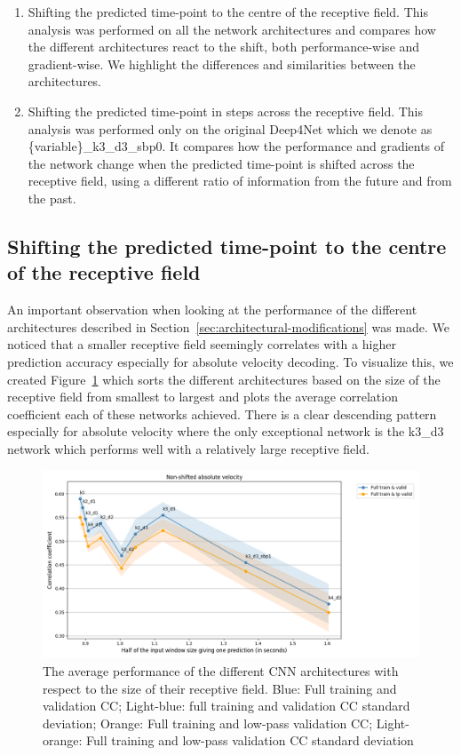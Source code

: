 \begin{enumerate}
    \item Shifting the predicted time-point to the centre of the receptive field.
This analysis was performed on all the network architectures and compares how the different architectures react to the shift, both performance-wise and gradient-wise.
We highlight the differences and similarities between the architectures.
    \item Shifting the predicted time-point in steps across the receptive field.
This analysis was performed only on the original Deep4Net which we denote as \{variable\}\_k3\_d3\_sbp0.
It compares how the performance and gradients of the network change when the predicted time-point is shifted across the receptive field, using a different ratio of information from the future and from the past.
\end{enumerate}


\subsection{Shifting the predicted time-point to the centre of the receptive field}\label{subsec:shifting-the-predicted-time-point-to-the-centre-of-the-receptive-field}
An important observation when looking at the performance of the different architectures described in Section~\ref{sec:architectural-modifications} was made.
We noticed that a smaller receptive field seemingly correlates with a higher prediction accuracy especially for absolute velocity decoding.
To visualize this, we created Figure~\ref{fig:figure-distance} which sorts the different architectures based on the size of the receptive field from smallest to largest and plots the average correlation coefficient each of these networks achieved.
There is a clear descending pattern especially for absolute velocity where the only exceptional network is the k3\_d3 network which performs well with a relatively large receptive field.


\begin{figure}[!htbp]
\centering
   \includegraphics[width=1\linewidth]{img/ch4/distance-shifted-performance-absVel}
   \caption[Dependence of performance on receptive field size]{The average performance of the different CNN architectures with respect to the size of their receptive field. Blue: Full training and validation CC; Light-blue: full training and validation CC standard deviation; Orange: Full training and low-pass validation CC; Light-orange: Full training and low-pass validation CC standard deviation}
   \label{fig:figure-distance}
\end{figure}

